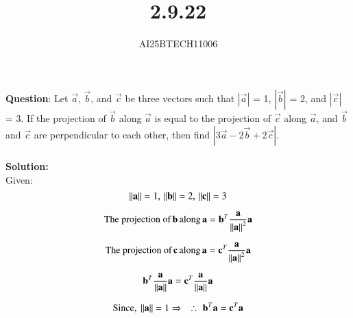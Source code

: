 \documentclass[journal]{IEEEtran}
\begin{document}

\vspace{3cm}

\title{2.9.22}
\author{AI25BTECH11006}
{\let\newpage\relax\maketitle}

\renewcommand{\thefigure}{\theenumi}
\renewcommand{\thetable}{\theenumi}
\setlength{\intextsep}{10pt} 


\renewcommand{\thetable}{\theenumi}


\textbf{Question}: Let $\overrightarrow{a}$,
$\overrightarrow{b}$, and $\overrightarrow{c}$ be three vectors such that $|\overrightarrow{a}|$ = 1, $|\overrightarrow{b}|$ = 2, and $|\overrightarrow{c}|$ = 3. If the
projection of $\overrightarrow{b}$ along $\overrightarrow{a}$ is equal to the projection of $\overrightarrow{c}$ along $\overrightarrow{a}$, and $\overrightarrow{b}$ and $\overrightarrow{c}$ are perpendicular to each other, then find $|3\overrightarrow{a} - 2\overrightarrow{b} + 2\overrightarrow{c}|$. \\\\


\textbf{Solution:}\\
Given: 
\begin{equation}
\left\lVert\mathbf{a}\right\rVert = 1, \, \left\lVert\mathbf{b}\right\rVert = 2, \, \left\lVert\mathbf{c}\right\rVert = 3\\
\end{equation}

\begin{equation}
\text{The projection of} \, \mathbf{b} \, \text{along} \, \mathbf{a} = \mathbf{b}^T\dfrac{\mathbf{a}}{\left\lVert\mathbf{a}\right\rVert^2}\mathbf{a}    
\end{equation}

\begin{equation}
\text{The projection of} \, \mathbf{c} \, \text{along} \, \mathbf{a} = \mathbf{c}^T\dfrac{\mathbf{a}}{\left\lVert\mathbf{a}\right\rVert^2}\mathbf{a}    
\end{equation}


\begin{equation}
\mathbf{b}^T\dfrac{\mathbf{a}}{\left\lVert\mathbf{a}\right\rVert}\mathbf{a} = \mathbf{c}^T\dfrac{\mathbf{a}}{\left\lVert\mathbf{a}\right\rVert}\mathbf{a}\\
\end{equation}

\begin{equation}
\text{Since, } \left\lVert\mathbf{a}\right\rVert = 1
\Rightarrow \quad
\therefore \, \, \mathbf{b}^T\mathbf{a} = \mathbf{c}^T\mathbf{a}
\end{equation}
\end{document}
